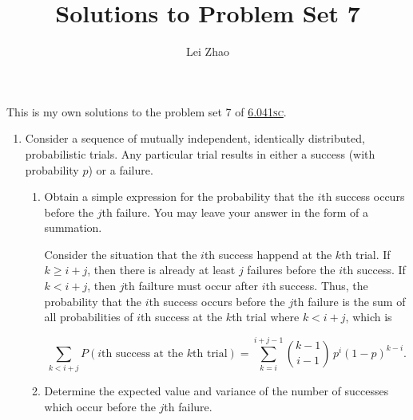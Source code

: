 

\title{Solutions to Problem Set 7}
\author{Lei Zhao}

\renewcommand{\thefootnote}{\fnsymbol{footnote}}


\maketitle

This is my own solutions to the problem set 7 of
\href{https://ocw.mit.edu/courses/electrical-engineering-and-computer-science/6-041sc-probabilistic-systems-analysis-and-applied-probability-fall-2013/unit-iii/lecture-15/}{6.041\textsc{sc}}.

\begin{enumerate}
  \item Consider a sequence of mutually independent, identically
  distributed, probabilistic trials.  Any particular trial results in
  either a success (with probability \(p\)) or a failure.
  \begin{enumerate}
  \item {} Obtain a simple expression for the
    probability that the \(i\)th success occurs before the \(j\)th
    failure.  You may leave your answer in the form of a summation.

    Consider the situation that the \(i\)th success happend at the
    \(k\)th trial.  If \(k \ge i+j\), then there is already at least
    \(j\) failures before the \(i\)th success.  If \(k < i+j\), then
    \(j\)th failture must occur after \(i\)th success.  Thus, the
    probability that the \(i\)th success occurs before the \(j\)th
    failure is the sum of all probabilities of \(i\)th success at the
    \(k\)th trial where \(k < i+j\), which is

    \[\sum_{k<i+j} P(i\text{th success at the }k\text{th trial}) = \sum_{k=i}^{i+j-1} \binom{k-1}{i-1} \, p^i (1-p)^{k-i}.\]

  \item {} Determine the expected value and variance
    of the number of successes which occur before the \(j\)th failure.


\end{enumerate}
\end{enumerate}

